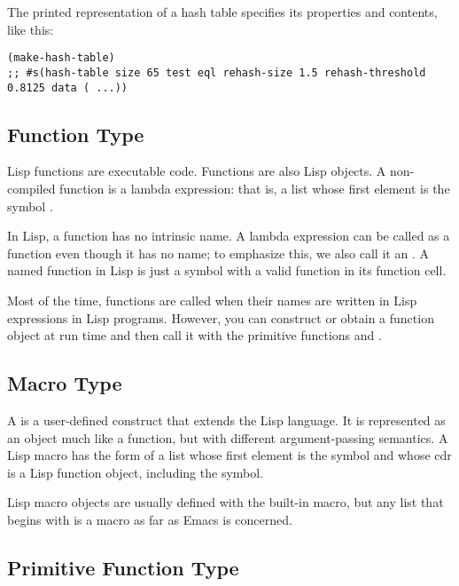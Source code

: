 The printed representation of a hash table specifies its properties and contents, like this:
\begin{lstlisting}
(make-hash-table)
;; #s(hash-table size 65 test eql rehash-size 1.5 rehash-threshold 0.8125 data ( ...))
\end{lstlisting}

\subsection{Function Type}
\label{sec:function-type}

Lisp functions are executable code.
Functions are also Lisp objects.
A non-compiled function is a lambda expression: that is, a list whose first element is the symbol .

In Lisp, a function has no intrinsic name.
A lambda expression can be called as a function even though it has no name; to emphasize this, we also call it an .
A named function in Lisp is just a symbol with a valid function in its function cell.

Most of the time, functions are called when their names are written in Lisp expressions in Lisp programs.
However, you can construct or obtain a function object at run time and then call it with the primitive functions  and .

\subsection{Macro Type}
\label{sec:macro-type}


A  is a user-defined construct that extends the Lisp language.
It is represented as an object much like a function, but with different argument-passing semantics.
A Lisp macro has the form of a list whose first element is the symbol  and whose cdr is a Lisp function object, including the  symbol.


Lisp macro objects are usually defined with the built-in  macro, but any list that begins with  is a macro as far as Emacs is concerned.




\subsection{Primitive Function Type}
\label{sec:prim-funct-type}

